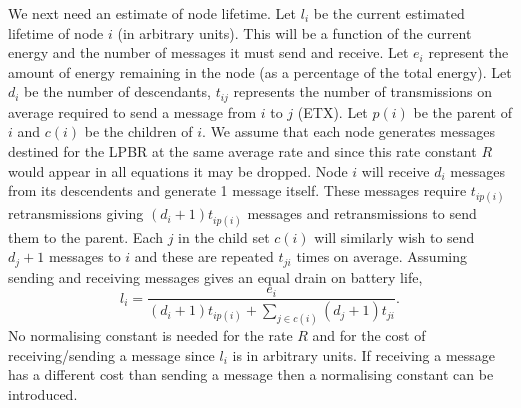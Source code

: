 
We next need an estimate of node lifetime.  Let $l_i$ be the current estimated lifetime of node $i$ (in arbitrary units).  This will be a function of the current energy and the number of messages it must send and receive.  Let $e_i$ represent the amount of energy remaining in the node (as a percentage of the total energy).  Let $d_i$ be the number of descendants, $t_{ij}$ represents the number of transmissions on average required to send a message from $i$ to $j$ (ETX).  Let $p(i)$ be the parent of $i$ and $c(i)$ be the children of $i$.  
We assume that each node generates messages destined for the LPBR at the same average rate and since this rate constant $R$ would appear in all equations it may be dropped.  Node $i$ will receive $d_i$ messages from its descendents and generate 1 message itself. These messages require $t_{ip(i)}$ retransmissions giving $(d_i + 1)t_{ip(i)}$ messages and retransmissions to send them to the parent.  Each $j$ in the child set $c(i)$ will similarly wish to send $d_j + 1$ messages to $i$ and these are repeated $t_{ji}$ times on average.  Assuming sending and receiving messages gives an equal drain on battery life,
\begin{equation}
l_i = \frac{e_i}{{(d_i + 1)t_{ip(i)} + \sum_{j \in c(i)} (d_j + 1)t_{ji}}}.\label{optimalEq}
\end{equation}
No normalising constant is needed for the rate $R$ and for the cost of receiving/sending a message since $l_i$ is in arbitrary units.  If receiving a message has a different cost than sending a message then a normalising constant can be introduced.

